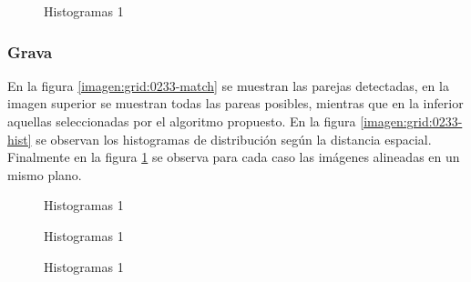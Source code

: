 \begin{figure}[h]
	\centering     %
	\hspace{1mm}%
	
	\caption[Histogramas 1]{Histogramas 1}
	\label{imagen:grid:0233-align}
\end{figure}


\subsubsection*{Grava}
En la figura \ref{imagen:grid:0233-match} se muestran las parejas detectadas, en la imagen superior se muestran todas las pareas posibles, mientras que en la inferior aquellas seleccionadas por el algoritmo propuesto. En la figura \ref{imagen:grid:0233-hist} se observan los histogramas de distribución según la distancia espacial. Finalmente en la figura \ref{imagen:grid:0233-align} se observa para cada caso las imágenes alineadas en un mismo plano.

\begin{figure}[h]
	\centering     %
	\hspace{1mm}%
	
	\caption[Histogramas 1]{Histogramas 1}
	\label{imagen:grid:geo-match}
\end{figure}

\begin{figure}[h]
	\centering     %
	\hspace{3mm}%
	
	\caption[Histogramas 1]{Histogramas 1}
	\label{imagen:grid:geo-hist}
\end{figure}
\begin{figure}[h]
	\centering     %
	\hspace{1mm}%
	
	\caption[Histogramas 1]{Histogramas 1}
	\label{imagen:grid:geo-align}
\end{figure}



